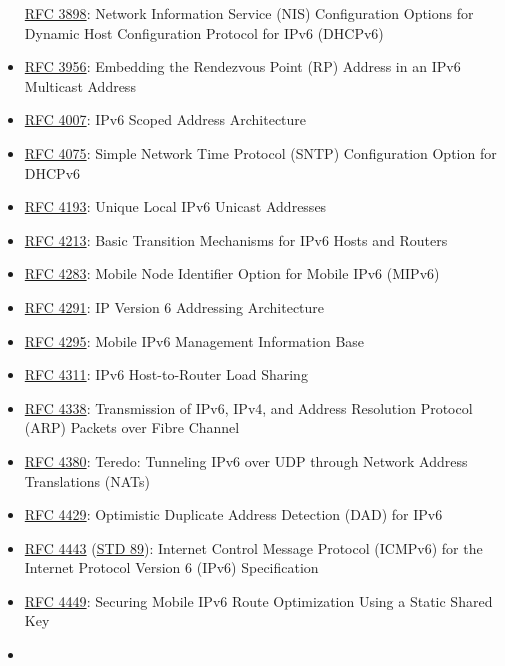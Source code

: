\documentclass[
]{article}
\begin{document}
\begin{itemize}
  \href{https://www.rfc-editor.org/info/rfc3898}{RFC 3898}: Network
  Information Service (NIS) Configuration Options for Dynamic Host
  Configuration Protocol for IPv6 (DHCPv6)
\item
  \href{https://www.rfc-editor.org/info/rfc3956}{RFC 3956}: Embedding
  the Rendezvous Point (RP) Address in an IPv6 Multicast Address
\item
  \href{https://www.rfc-editor.org/info/rfc4007}{RFC 4007}: IPv6 Scoped
  Address Architecture
\item
  \href{https://www.rfc-editor.org/info/rfc4075}{RFC 4075}: Simple
  Network Time Protocol (SNTP) Configuration Option for DHCPv6
\item
  \href{https://www.rfc-editor.org/info/rfc4193}{RFC 4193}: Unique Local
  IPv6 Unicast Addresses
\item
  \href{https://www.rfc-editor.org/info/rfc4213}{RFC 4213}: Basic
  Transition Mechanisms for IPv6 Hosts and Routers
\item
  \href{https://www.rfc-editor.org/info/rfc4283}{RFC 4283}: Mobile Node
  Identifier Option for Mobile IPv6 (MIPv6)
\item
  \href{https://www.rfc-editor.org/info/rfc4291}{RFC 4291}: IP Version 6
  Addressing Architecture
\item
  \href{https://www.rfc-editor.org/info/rfc4295}{RFC 4295}: Mobile IPv6
  Management Information Base
\item
  \href{https://www.rfc-editor.org/info/rfc4311}{RFC 4311}: IPv6
  Host-to-Router Load Sharing
\item
  \href{https://www.rfc-editor.org/info/rfc4338}{RFC 4338}: Transmission
  of IPv6, IPv4, and Address Resolution Protocol (ARP) Packets over
  Fibre Channel
\item
  \href{https://www.rfc-editor.org/info/rfc4380}{RFC 4380}: Teredo:
  Tunneling IPv6 over UDP through Network Address Translations (NATs)
\item
  \href{https://www.rfc-editor.org/info/rfc4429}{RFC 4429}: Optimistic
  Duplicate Address Detection (DAD) for IPv6
\item
  \href{https://www.rfc-editor.org/info/rfc4443}{RFC 4443}
  (\href{https://www.rfc-editor.org/info/std89}{STD 89}): Internet
  Control Message Protocol (ICMPv6) for the Internet Protocol Version 6
  (IPv6) Specification
\item
  \href{https://www.rfc-editor.org/info/rfc4449}{RFC 4449}: Securing
  Mobile IPv6 Route Optimization Using a Static Shared Key
\item

\end{itemize}
\end{document}
